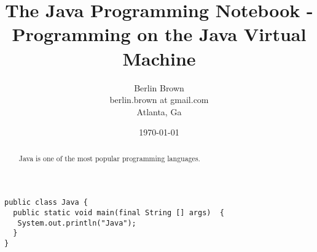 \documentclass[9pt]{report}
\begin{document}
\title{The Java Programming Notebook - Programming on the Java Virtual Machine}

\author{Berlin Brown\\
  berlin.brown at gmail.com\\
  Atlanta, Ga\\
  \date{\today}}

\maketitle


\begin{abstract}

Java is one of the most popular programming languages.

\end{abstract}

\tableofcontents



\begin{lstlisting}
public class Java {
  public static void main(final String [] args)  {
   System.out.println("Java");
  }
}
\end{lstlisting}



\nocite{*}

\end{document}
